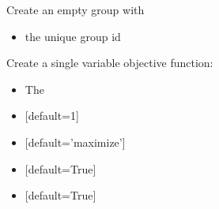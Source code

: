 \documentclass[letterpaper,10pt,english]{sphinxmanual}
\begin{document}
\begin{fulllineitems}
\begin{fulllineitems}
\label{\detokenize{modules_doc:cbmpy.CBModel.Model.createGroup}}
\pysigstartsignatures
{}
\pysigstopsignatures
\sphinxAtStartPar
Create an empty group with
\begin{itemize}
\item {} 
\sphinxAtStartPar
{} the unique group id

\end{itemize}

\end{fulllineitems}


\begin{fulllineitems}
\label{\detokenize{modules_doc:cbmpy.CBModel.Model.createObjectiveFunction}}
\pysigstartsignatures
{}
\pysigstopsignatures
\sphinxAtStartPar
Create a single variable objective function:
\begin{itemize}
\item {} 
\sphinxAtStartPar
{} The

\item {} 
\sphinxAtStartPar
{} {[}default=1{]}

\item {} 
\sphinxAtStartPar
{} {[}default=’maximize’{]}

\item {} 
\sphinxAtStartPar
{} {[}default=True{]}

\item {} 
\sphinxAtStartPar
{} {[}default=True{]}

\end{itemize}


\end{fulllineitems}
\end{fulllineitems}
\end{document}
